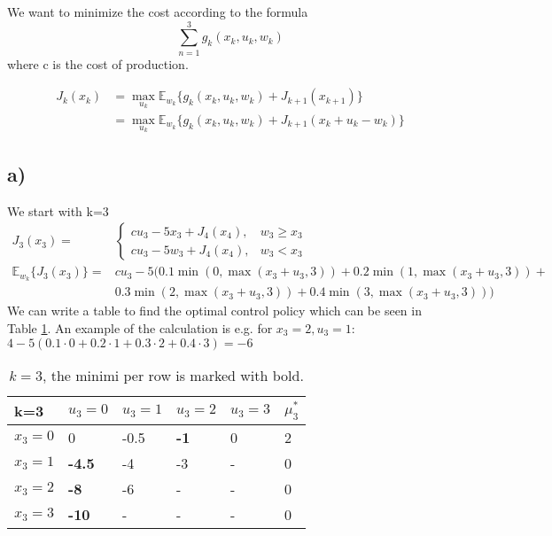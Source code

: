 \documentclass{article}
\begin{document}
We want to minimize the cost  according to the formula
\begin{equation}
	\sum_{n=1}^{3} g_k(x_k,u_k,w_k)
\end{equation}
where c is the cost of production.

\begin{align}
	J_k(x_k) &= \max_{u_k} \mathbb{E}_{w_k} \lbrace g_k(x_k,u_k,w_k) + J_{k+1}(x_{k+1}) \rbrace \\
	&= \max_{u_k} \mathbb{E}_{w_k} \lbrace g_k(x_k,u_k,w_k) + J_{k+1}(x_{k} + u_k - w_k) \rbrace
\end{align}
\subsection*{a)}
We start with k=3
\begin{align}
	J_3(x_3) =& 
	\begin{cases}
		c u_3 - 5x_3 + J_4(x_4), & w_3 \geq x_3\\
		c u_3 - 5w_3 + J_4(x_4), & w_3 < x_3
	\end{cases}\\
	\mathbb{E}_{w_k}\lbrace J_3(x_3)\rbrace =& cu_3 -5(0.1\min(0,\max(x_3+u_3,3)) + 0.2\min(1,\max(x_3+u_3,3)) +\\ &0.3\min(2,\max(x_3+u_3,3))+0.4\min(3,\max(x_3+u_3,3)))
\end{align}
We can write a table to find the optimal control policy which can be seen in Table \ref{tab:k3}. An example of the calculation is e.g. for $x_3 = 2, u_3 = 1$: $4-5(0.1\cdot0 + 0.2\cdot1 +0.3\cdot2+0.4\cdot3) = -6$
\begin{table}[h]
	\centering
	\caption{$k=3$, the minimi per row is marked with bold.}
	\label{tab:k3}
	\begin{tabular}{l|llll|l}
		k=3     & $u_3=0$       & $u_3=1$ & $u_3=2$     & $u_3=3$ & $\mu_3^*$ \\ \hline
		$x_3=0$ & 0             & -0.5    & \textbf{-1} & 0       & 2         \\
		$x_3=1$ & \textbf{-4.5} & -4      & -3          & -       & 0         \\
		$x_3=2$ & \textbf{-8}   & -6      & -           & -       & 0         \\
		$x_3=3$ & \textbf{-10}  & -       & -           & -       & 0        
	\end{tabular}
\end{table}
\end{document}
